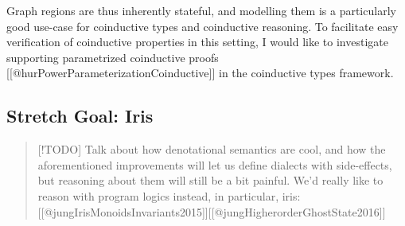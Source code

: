 Graph regions are thus inherently stateful, and modelling them is a
particularly good use-case for coinductive types and coinductive
reasoning. To facilitate easy verification of coinductive properties in
this setting, I would like to investigate supporting parametrized
coinductive proofs {[}{[}@hurPowerParameterizationCoinductive{]}{]} in
the coinductive types framework.

\hypertarget{stretch-goal-iris}{%
\subsection{Stretch Goal: Iris}\label{stretch-goal-iris}}

\begin{quote}
{[}!TODO{]} Talk about how denotational semantics are cool, and how the
aforementioned improvements will let us define dialects with
side-effects, but reasoning about them will still be a bit painful. We'd
really like to reason with program logics instead, in particular, iris:
{[}{[}@jungIrisMonoidsInvariants2015{]}{]}{[}{[}@jungHigherorderGhostState2016{]}{]}
\end{quote}
